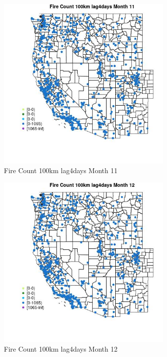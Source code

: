 \begin{figure} 
\centering  
\includegraphics[width=0.77\textwidth]{Code_Outputs/Report_ML_input_PM25_Step4_part_f_de_duplicated_aveswNAs_MapObsMo11Fire_Count_100km_lag4days.jpg} 
\caption{\label{fig:Report_ML_input_PM25_Step4_part_f_de_duplicated_aveswNAsMapObsMo11Fire_Count_100km_lag4days}Fire Count 100km lag4days Month 11} 
\end{figure} 
 

\clearpage 

\begin{figure} 
\centering  
\includegraphics[width=0.77\textwidth]{Code_Outputs/Report_ML_input_PM25_Step4_part_f_de_duplicated_aveswNAs_MapObsMo12Fire_Count_100km_lag4days.jpg} 
\caption{\label{fig:Report_ML_input_PM25_Step4_part_f_de_duplicated_aveswNAsMapObsMo12Fire_Count_100km_lag4days}Fire Count 100km lag4days Month 12} 
\end{figure} 
 

